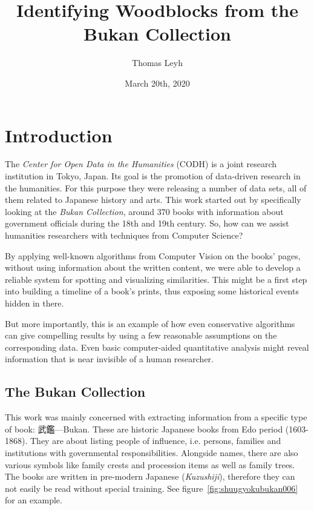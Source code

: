 \documentclass{ltjarticle}
\title{Identifying Woodblocks from the Bukan Collection}
\author{Thomas Leyh}
\date{March 20th, 2020}
\begin{document}
\maketitle

\section{Introduction}

The \emph{Center for Open Data in the Humanities} (CODH) is a joint research institution in Tokyo, Japan. Its goal is the promotion of data-driven research in the humanities.\cite{kitamoto2017codh} For this purpose they were releasing a number of data sets, all of them related to Japanese history and arts. This work started out by specifically looking at the \emph{Bukan Collection}\cite{codh2018bukan}, around 370 books with information about government officials during the 18th and 19th century. So, how can we assist humanities researchers with techniques from Computer Science?

By applying well-known algorithms from Computer Vision on the books' pages, without using information about the written content, we were able to develop a reliable system for spotting and visualizing similarities. This might be a first step into building a timeline of a book's prints, thus exposing some historical events hidden in there.

But more importantly, this is an example of how even conservative algorithms can give compelling results by using a few reasonable assumptions on the corresponding data. Even basic computer-aided quantitative analysis might reveal information that is near invisible of a human researcher.

\subsection{The Bukan Collection}

This work was mainly concerned with extracting information from a specific type of book: 武鑑---Bukan. These are historic Japanese books from Edo period (1603-1868). They are about listing people of influence, i.e. persons, families and institutions with governmental responsibilities. Alongside names, there are also various symbols like family crests and procession items as well as family trees. The books are written in pre-modern Japanese (\emph{Kuzushiji}), therefore they can not easily be read without special training. See figure~\ref{fig:shuugyokubukan006} for an example.
\end{document}
